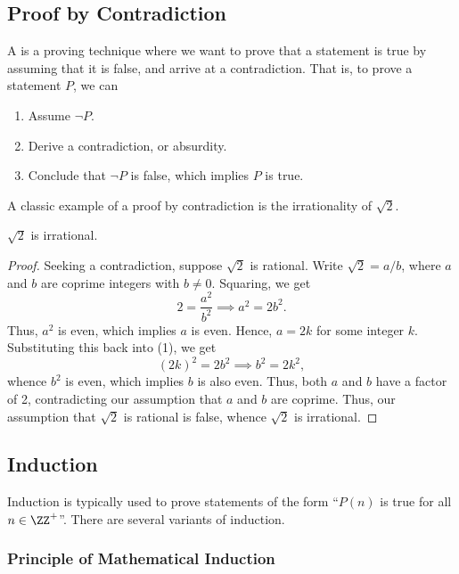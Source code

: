 \subsection{Proof by Contradiction}

A  is a proving technique where we want to prove that a statement is true by assuming that it is false, and arrive at a contradiction. That is, to prove a statement $P$, we can 
\renewcommand{\theenumi}{\arabic{enumi}.}
\begin{enumerate}
    \item Assume $\lnot P$.
    \item Derive a contradiction, or absurdity.
    \item Conclude that $\lnot P$ is false, which implies $P$ is true.
\end{enumerate}
\renewcommand{\theenumi}{(\alph{enumi})}

A classic example of a proof by contradiction is the irrationality of $\sqrt 2$.

\begin{statement}
    $\sqrt2$ is irrational.
\end{statement}
\begin{proof}
    Seeking a contradiction, suppose $\sqrt2$ is rational. Write $\sqrt2 = a/b$, where $a$ and $b$ are coprime integers with $b \neq 0$. Squaring, we get \[2 = \frac{a^2}{b^2} \implies a^2 = 2b^2. \tag{1}\] Thus, $a^2$ is even, which implies $a$ is even. Hence, $a = 2k$ for some integer $k$. Substituting this back into (1), we get \[(2k)^2 = 2b^2 \implies b^2 = 2k^2,\] whence $b^2$ is even, which implies $b$ is also even. Thus, both $a$ and $b$ have a factor of 2, contradicting our assumption that $a$ and $b$ are coprime. Thus, our assumption that $\sqrt2$ is rational is false, whence $\sqrt2$ is irrational.
\end{proof}

\subsection{Induction}

Induction is typically used to prove statements of the form ``$P(n)$ is true for all $n \in \ZZ^+$''. There are several variants of induction.

\subsubsection{Principle of Mathematical Induction}

